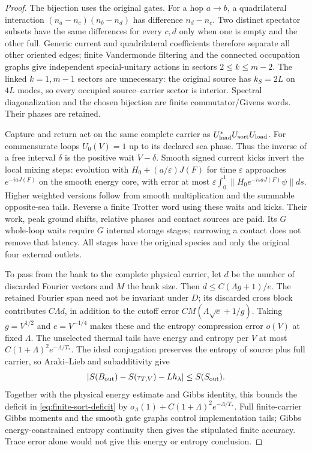 \begin{proof}
The bijection uses the original gates. For a hop $a\to b$, a
quadrilateral interaction $(n_a-n_c)(n_b-n_d)$ has difference
$n_d-n_c$. Two distinct spectator subsets have the same differences
for every $c,d$ only when one is empty and the other full.
Generic current and quadrilateral coefficients therefore separate
all other oriented edges; finite Vandermonde filtering and the
connected occupation graphs give independent special-unitary
actions in sectors $2\le k\le m-2$. The linked $k=1,m-1$
sectors are unnecessary: the original source has $k_S=2L$ on
$4L$ modes, so every occupied source--carrier sector is interior.
Spectral diagonalization and the chosen bijection are finite
commutator/Givens words. Their phases are retained.

Capture and return act on the same complete carrier as
$U_{\rm load}^*U_{\rm sort}U_{\rm load}$.
For commensurate loops $U_0(V)=1$ up to its declared sea phase.
Thus the inverse of a free interval $\delta$ is the positive wait
$V-\delta$. Smooth signed current kicks invert the local mixing
steps: evolution with $H_0+(a/\varepsilon)J(F)$ for time
$\varepsilon$ approaches $e^{-iaJ(F)}$ on the smooth energy
core, with error at most
$\varepsilon\int_0^1\|H_0e^{-isaJ(F)}\psi\|ds$.
Higher weighted versions follow from smooth multiplication and
the summable opposite-sea tails. Reverse a finite Trotter word
using these waits and kicks. Their work, peak ground shifts,
relative phases and contact sources are paid. Its $G$ whole-loop
waits require $G$ internal storage stages; narrowing a contact
does not remove that latency. All stages have the original species
and only the original four external outlets.

To pass from the bank to the complete physical carrier, let $d$
be the number of discarded Fourier vectors and $M$ the bank size.
Then $d\le C(\Lambda g+1)/e$. The retained Fourier span need
not be invariant under $D$; its discarded cross block contributes
$C\Lambda d$, in addition to the cutoff error
$CM(\Lambda\sqrt e+1/g)$.
Taking $g=V^{1/2}$ and $e=V^{-1/4}$ makes these and the entropy
compression error $o(V)$ at fixed $\Lambda$.
The unselected thermal tails have energy and entropy per $V$
at most $C(1+\Lambda)^2e^{-\Lambda/T_*}$.
The ideal conjugation preserves the entropy of source plus full
carrier, so Araki--Lieb and subadditivity give
\[
 \left|S(B_{\rm out})-S(\tau_{T,V})-Lh_\lambda\right|
       \le S(S_{\rm out}).
\]
Together with the physical energy estimate and Gibbs identity,
this bounds the deficit in \eqref{eq:finite-sort-deficit} by
$o_\Lambda(1)+C(1+\Lambda)^2e^{-\Lambda/T_*}$.
Full finite-carrier Gibbs moments and the smooth gate graphs
control implementation tails; Gibbs energy-constrained entropy
continuity then gives the stipulated finite accuracy. Trace error
alone would not give this energy or entropy conclusion.
\end{proof}

